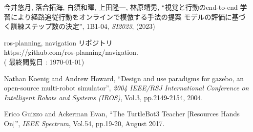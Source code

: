 \documentclass{jarticle}
\begin{document}
\begin{thebibliography}{99}
今井悠月, 落合拓海, 白須和暉, 上田隆一, 林原靖男, “視覚と行動のend-to-end 学習により経路追従行動をオンラインで模倣する手法の提案 モデルの評価に基づく訓練ステップ数の決定”, 1B1-04, \textit{SI2023}, (2023)

ros-planning, navigation リポジトリ\\
https://github.com/ros-planning/navigation.\\
( 最終閲覧日 : \today )

Nathan Koenig and Andrew Howard, “Design and use paradigms for gazebo, an open-source multi-robot simulator”, \textit{2004 IEEE/RSJ International Conference on Intelligent Robots and Systems (IROS)}, Vol.3, pp.2149-2154, 2004.

Erico Guizzo and Ackerman Evan, “The TurtleBot3 Teacher [Resources Hands On]”, \textit{IEEE Spectrum}, Vol.54, pp.19-20, August 2017.

\end{thebibliography}


\normalsize
\end{document}
